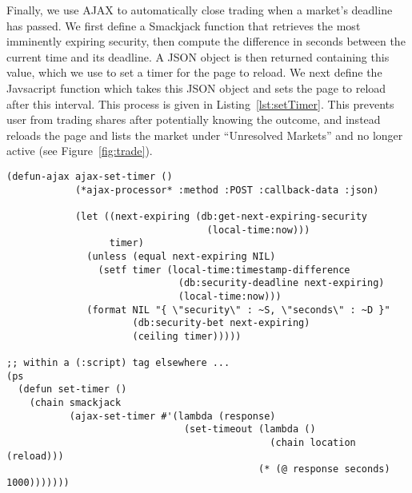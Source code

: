 Finally, we use AJAX to automatically close trading when a market's deadline
has passed. We first define a Smackjack function that retrieves the most
imminently expiring security, then compute the difference in seconds between
the current time and its deadline. A JSON object is then returned containing
this value, which we use to set a timer for the page to reload. We next define
the Javsacript function  which takes this JSON object and sets
the page to reload after this interval. This process is given in
Listing~\ref{lst:setTimer}. This prevents user from trading shares after
potentially knowing the outcome, and instead reloads the page and lists the
market under ``Unresolved Markets'' and no longer active (see
Figure~\ref{fig:trade}).

\begin{lstlisting}[float,
	label={lst:setTimer},
	caption={Triggering the close of trading automatically}]
(defun-ajax ajax-set-timer ()
			(*ajax-processor* :method :POST :callback-data :json)

			(let ((next-expiring (db:get-next-expiring-security
								   (local-time:now)))
				  timer)
			  (unless (equal next-expiring NIL)
				(setf timer (local-time:timestamp-difference
							  (db:security-deadline next-expiring)
							  (local-time:now)))
			  (format NIL "{ \"security\" : ~S, \"seconds\" : ~D }"
					  (db:security-bet next-expiring)
					  (ceiling timer)))))

;; within a (:script) tag elsewhere ...
(ps
  (defun set-timer ()
	(chain smackjack
		   (ajax-set-timer #'(lambda (response)
							   (set-timeout (lambda ()
											  (chain location (reload)))
									 		(* (@ response seconds) 1000)))))))
\end{lstlisting}
